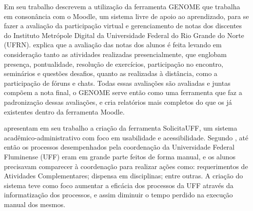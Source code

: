 Em seu trabalho \cite{gomes2012genome} descrevem a utilização da ferramenta GENOME que trabalha em consonância com o Moodle, um sistema livre de apoio ao aprendizado, para se fazer a avaliação da participação virtual e gerenciamento de notas dos discentes do Instituto Metrópole Digital da Universidade Federal do Rio Grande do Norte (UFRN). \cite{gomes2012genome} explica que a avaliação das notas dos alunos é feita levando em consideração tanto as atividades realizadas presencialmente,  que englobam presença, pontualidade,
resolução de exercícios, participação no encontro, seminários e questões desafios, quanto as realizadas à distância, como a participação de fóruns e chats. Todas essas avaliações são avaliadas e juntas compõem a nota final, o GENOME serve então como uma ferramenta que faz a padronização dessas avaliações, e cria relatórios mais completos do que os já existentes dentro da ferramenta Moodle.




\cite{rodriguez2018desenvolvimento} apresentam em seu trabalho a criação da ferramenta SolicitaUFF, um sistema acadêmico-administrativo com foco em usabilidade e acessibilidade. Segundo \cite{rodriguez2018desenvolvimento}, até então os processos desempenhados pela coordenação da Universidade Federal Fluminense (UFF) eram em grande parte feitos de forma manual, e os alunos precisavam comparecer à coordenação para realizar ações como: requerimentos de Atividades Complementares; dispensa em disciplinas; entre outras. A criação do sistema teve como foco aumentar a eficácia dos processos da UFF através da informatização dos processos, e assim diminuir o tempo perdido na execução manual dos mesmos.

